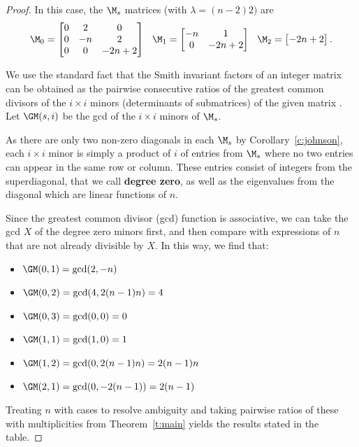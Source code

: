 \begin{proof}
In this case, the $\M_s$ matrices (with $\lambda = (n-2)2)$ are
\[ \M_0 = \begin{bmatrix} 0 & 2 & 0 \\ 0 & -n & 2 \\ 0 & 0 & -2n + 2 \end{bmatrix} 
    \hspace{0.1in}
 \M_1 = \begin{bmatrix} -n & 1 \\ 0 & -2n + 2 \end{bmatrix} 
    \hspace{0.1in}
 \M_2 = \begin{bmatrix} -2n + 2 \end{bmatrix}. \]

We use the standard fact that the Smith invariant factors of an integer matrix can be obtained as the pairwise consecutive ratios of the greatest common divisors of the $i \times i$ minors (\ie determinants of submatrices) of the given matrix \cite{smith1861}.  Let $\GM(s, i)$ be the gcd of the $i \times i$ minors of $\M_s$.

As there are only two non-zero diagonals in each $\M_s$ by Corollary~\ref{c:johnson}, each $i \times i$ minor is simply a product of $i$ of entries from $\M_s$ where no two entries can appear in the same row or column.  These entries consist of integers from the superdiagonal, that we call {\bf degree zero}, as well as the eigenvalues from the diagonal which are linear functions of $n$.

Since the greatest common divisor (gcd) function is associative, we can take the gcd $X$ of the degree zero minors first, and then compare with expressions of $n$ that are not already divisible by $X$.  In this way, we find that:
\begin{itemize}
    \item $\GM(0, 1) = \gcd(2, -n)$
    \item $\GM(0, 2) = \gcd(4, 2(n-1)n) = 4$
    \item $\GM(0, 3) = \gcd(0, 0) = 0$

    \item $\GM(1, 1) = \gcd(1, 0) = 1$
    \item $\GM(1, 2) = \gcd(0, 2(n-1)n) = 2 (n - 1) n$

    \item $\GM(2, 1) = \gcd(0, -2 (n - 1)) = 2(n-1)$
\end{itemize}
Treating $n$ with cases to resolve ambiguity and taking pairwise ratios of these with multiplicities from Theorem~\ref{t:main} yields the results stated in the table.
\end{proof}


